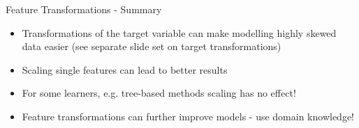 \documentclass[11pt,compress,t,notes=noshow, xcolor=table]{beamer}
\begin{document}
\begin{vbframe}{Feature Transformations - Summary}

\begin{itemize}
\item Transformations of the target variable can make modelling highly skewed data easier (see separate slide set on target transformations)

\item Scaling single features can lead to better results

\item For some learners, e.g. tree-based methods scaling has no effect!

\item Feature transformations can further improve models - use domain knowledge!
\end{itemize}

\end{vbframe}



\endlecture
\end{document}
